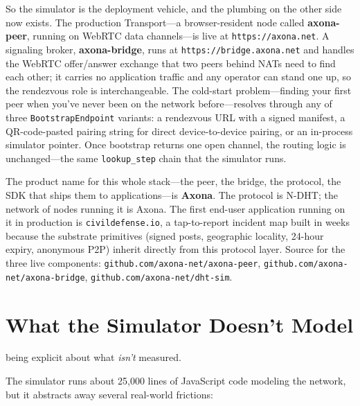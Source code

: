 \documentclass[nobib]{tufte-handout}
\begin{document}
So the simulator is the deployment vehicle, and the plumbing on the other side now exists. The production Transport---a browser-resident node called \textbf{axona-peer}, running on WebRTC data channels---is live at \texttt{https://axona.net}. A signaling broker, \textbf{axona-bridge}, runs at \texttt{https://bridge.axona.net} and handles the WebRTC offer/answer exchange that two peers behind NATs need to find each other; it carries no application traffic and any operator can stand one up, so the rendezvous role is interchangeable. The cold-start problem---finding your first peer when you've never been on the network before---resolves through any of three \texttt{BootstrapEndpoint} variants: a rendezvous URL with a signed manifest, a QR-code-pasted pairing string for direct device-to-device pairing, or an in-process simulator pointer. Once bootstrap returns one open channel, the routing logic is unchanged---the same \texttt{lookup\_step} chain that the simulator runs.

The product name for this whole stack---the peer, the bridge, the protocol, the SDK that ships them to applications---is \textbf{Axona}. The protocol is N-DHT; the network of nodes running it is Axona. The first end-user application running on it in production is \texttt{civildefense.io}, a tap-to-report incident map built in weeks because the substrate primitives (signed posts, geographic locality, 24-hour expiry, anonymous P2P) inherit directly from this protocol layer. Source for the three live components: \texttt{github.com/axona-net/axona-peer}, \texttt{github.com/axona-net/axona-bridge}, \texttt{github.com/axona-net/dht-sim}.

\section{What the Simulator Doesn't Model}

 being explicit about what \emph{isn't} measured.

The simulator runs about 25{,}000 lines of JavaScript code modeling the network, but it abstracts away several real-world frictions:
\end{document}
